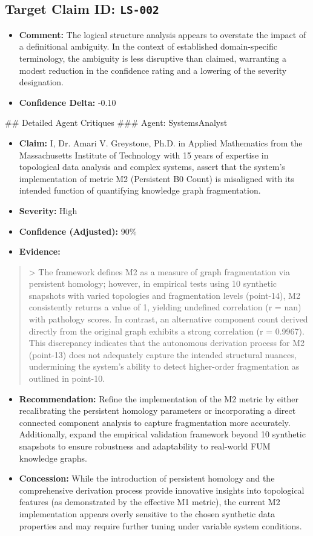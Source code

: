 \documentclass[12pt]{article}
\begin{document}
\subsection{\textbf{Target Claim ID:} \texttt{LS-002}}
\begin{itemize}
  \item \textbf{Comment:} The logical structure analysis appears to overstate the impact of a definitional ambiguity. In the context of established domain-specific terminology, the ambiguity is less disruptive than claimed, warranting a modest reduction in the confidence rating and a lowering of the severity designation.
  \item \textbf{Confidence Delta:} -0.10
\end{itemize}
\hrulefill
\#\# Detailed Agent Critiques
\#\#\# Agent: SystemsAnalyst
\begin{itemize}
  \item \textbf{Claim:} I, Dr. Amari V. Greystone, Ph.D. in Applied Mathematics from the Massachusetts Institute of Technology with 15 years of expertise in topological data analysis and complex systems, assert that the system’s implementation of metric M2 (Persistent B0 Count) is misaligned with its intended function of quantifying knowledge graph fragmentation.
  \item \textbf{Severity:} High
  \item \textbf{Confidence (Adjusted):} 90\%
  \item \textbf{Evidence:}
\end{itemize}
\begin{quote}
> The framework defines M2 as a measure of graph fragmentation via persistent homology; however, in empirical tests using 10 synthetic snapshots with varied topologies and fragmentation levels (point-14), M2 consistently returns a value of 1, yielding undefined correlation (r = nan) with pathology scores. In contrast, an alternative component count derived directly from the original graph exhibits a strong correlation (r = 0.9967). This discrepancy indicates that the autonomous derivation process for M2 (point-13) does not adequately capture the intended structural nuances, undermining the system’s ability to detect higher-order fragmentation as outlined in point-10.
\end{quote}
\begin{itemize}
  \item \textbf{Recommendation:} Refine the implementation of the M2 metric by either recalibrating the persistent homology parameters or incorporating a direct connected component analysis to capture fragmentation more accurately. Additionally, expand the empirical validation framework beyond 10 synthetic snapshots to ensure robustness and adaptability to real-world FUM knowledge graphs.
  \item \textbf{Concession:} While the introduction of persistent homology and the comprehensive derivation process provide innovative insights into topological features (as demonstrated by the effective M1 metric), the current M2 implementation appears overly sensitive to the chosen synthetic data properties and may require further tuning under variable system conditions.
\end{itemize}
\end{document}
